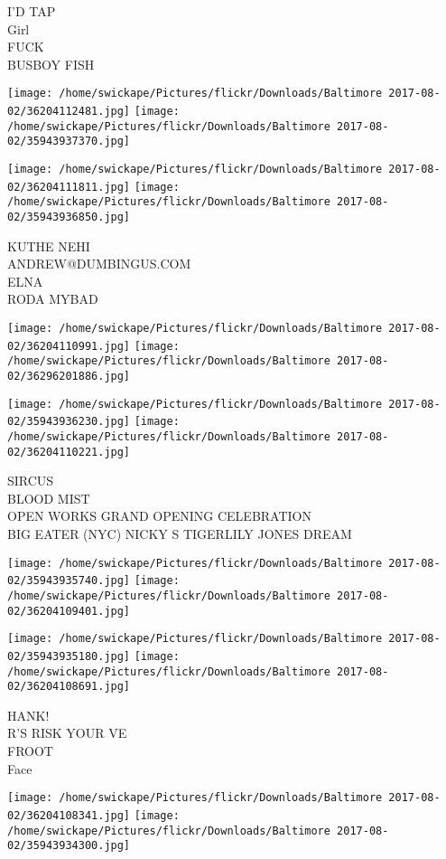 \documentclass[10pt,letterpaper]{article}
\begin{document}
I'D TAP\\
Girl\\
FUCK\\
BUSBOY FISH
\pagebreak

\texttt{[image: /home/swickape/Pictures/flickr/Downloads/Baltimore 2017-08-02/36204112481.jpg]}
\texttt{[image: /home/swickape/Pictures/flickr/Downloads/Baltimore 2017-08-02/35943937370.jpg]}

\texttt{[image: /home/swickape/Pictures/flickr/Downloads/Baltimore 2017-08-02/36204111811.jpg]}
\texttt{[image: /home/swickape/Pictures/flickr/Downloads/Baltimore 2017-08-02/35943936850.jpg]}

KUTHE NEHI\\
ANDREW@DUMBINGUS.COM\\
ELNA\\
RODA MYBAD
\pagebreak

\texttt{[image: /home/swickape/Pictures/flickr/Downloads/Baltimore 2017-08-02/36204110991.jpg]}
\texttt{[image: /home/swickape/Pictures/flickr/Downloads/Baltimore 2017-08-02/36296201886.jpg]}

\texttt{[image: /home/swickape/Pictures/flickr/Downloads/Baltimore 2017-08-02/35943936230.jpg]}
\texttt{[image: /home/swickape/Pictures/flickr/Downloads/Baltimore 2017-08-02/36204110221.jpg]}

SIRCUS\\
BLOOD MIST\\
OPEN WORKS GRAND OPENING CELEBRATION\\
BIG EATER (NYC) NICKY S TIGERLILY JONES DREAM
\pagebreak

\texttt{[image: /home/swickape/Pictures/flickr/Downloads/Baltimore 2017-08-02/35943935740.jpg]}
\texttt{[image: /home/swickape/Pictures/flickr/Downloads/Baltimore 2017-08-02/36204109401.jpg]}

\texttt{[image: /home/swickape/Pictures/flickr/Downloads/Baltimore 2017-08-02/35943935180.jpg]}
\texttt{[image: /home/swickape/Pictures/flickr/Downloads/Baltimore 2017-08-02/36204108691.jpg]}

HANK!\\
R'S RISK YOUR VE\\
FROOT\\
Face
\pagebreak

\texttt{[image: /home/swickape/Pictures/flickr/Downloads/Baltimore 2017-08-02/36204108341.jpg]}
\texttt{[image: /home/swickape/Pictures/flickr/Downloads/Baltimore 2017-08-02/35943934300.jpg]}
\end{document}
